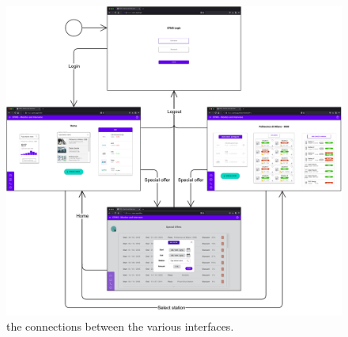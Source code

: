\begin{figure}[h!]
    \centering
    \includegraphics[width=\columnwidth]{./images/connections/cpms}
    \caption{the connections between the various interfaces.}
\end{figure}
